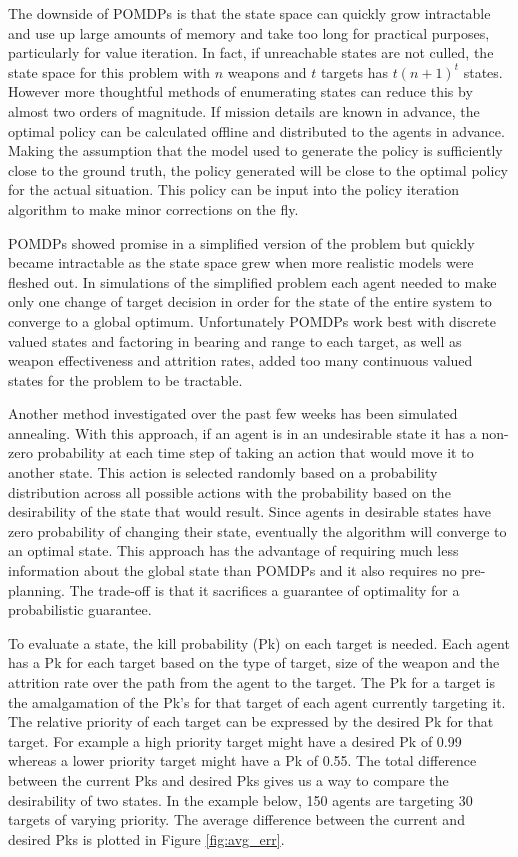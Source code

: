 \documentclass{article}
\begin{document}
The downside of POMDPs is that the state space can quickly grow intractable and use up large amounts of memory and take too long for practical purposes, particularly for value iteration. In fact, if unreachable states are not culled, the state space for this problem with $n$ weapons and $t$ targets has $t\left(n+1\right)^{t}$ states. However more thoughtful methods of enumerating states can reduce this by almost two orders of magnitude. If mission details are known in advance, the optimal policy can be calculated offline and distributed to the agents in advance. Making the assumption that the model used to generate the policy is sufficiently close to the ground truth, the policy generated will be close to the optimal policy for the actual situation. This policy can be input into the policy iteration algorithm to make minor corrections on the fly.

POMDPs showed promise in a simplified version of the problem but quickly became intractable as the state space grew when more realistic models were fleshed out. In simulations of the simplified problem each agent needed to make only one change of target decision in order for the state of the entire system to converge to a global optimum. Unfortunately POMDPs work best with discrete valued states and factoring in bearing and range to each target, as well as weapon effectiveness and attrition rates, added too many continuous valued states for the problem to be tractable.

Another method investigated over the past few weeks has been simulated annealing. With this approach, if an agent is in an undesirable state it has a non-zero probability at each time step of taking an action that would move it to another state. This action is selected randomly based on a probability distribution across all possible actions with the probability based on the desirability of the state that would result. Since agents in desirable states have zero probability of changing their state, eventually the algorithm will converge to an optimal state. This approach has the advantage of requiring much less information about the global state than POMDPs and it also requires no pre-planning. The trade-off is that it sacrifices a guarantee of optimality for a probabilistic guarantee.

To evaluate a state, the kill probability (Pk) on each target is needed. Each agent has a Pk for each target based on the type of target, size of the weapon and the attrition rate over the path from the agent to the target. The Pk for a target is the amalgamation of the Pk's for that target of each agent currently targeting it. The relative priority of each target can be expressed by the desired Pk for that target. For example a high priority target might have a desired Pk of 0.99 whereas a lower priority target might have a Pk of 0.55. The total difference between the current Pks and desired Pks gives us a way to compare the desirability of two states. In the example below, 150 agents are targeting 30 targets of varying priority. The average difference between the current and desired Pks is plotted in Figure \ref{fig:avg_err}.
\end{document}
